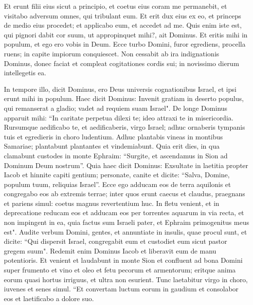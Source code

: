 \begin{biblechapter}
\verse Et erunt filii eius sicut a principio, et coetus eius coram me permanebit, et visitabo adversum omnes, qui tribulant eum. 
\verse Et erit dux eius ex eo, et princeps de medio eius procedet; et applicabo eum, et accedet ad me. Quis enim iste est, qui pignori dabit cor suum, ut appropinquet mihi?, ait Dominus. 
\verse Et eritis mihi in populum, et ego ero vobis in Deum. 
\verse Ecce turbo Domini, furor egrediens, procella ruens; in capite impiorum conquiescet. 
\verse Non cessabit ab ira indignationis Dominus, donec faciat et compleat cogitationes cordis sui; in novissimo dierum intellegetis ea. 
\end{biblechapter}

\begin{biblechapter}  
\verse In tempore illo, dicit Dominus, ero Deus universis cognationibus Israel, et ipsi erunt mihi in populum. 
\verse Haec dicit Dominus: Invenit gratiam in deserto populus, qui remanserat a gladio; vadet ad requiem suam Israel". 
\verse De longe Dominus apparuit mihi: “In caritate perpetua dilexi te; ideo attraxi te in misericordia. 
\verse Rursumque aedificabo te, et aedificaberis, virgo Israel; adhuc ornaberis tympanis tuis et egredieris in choro ludentium. 
\verse Adhuc plantabis vineas in montibus Samariae; plantabunt plantantes et vindemiabunt. 
\verse Quia erit dies, in qua clamabunt custodes in monte Ephraim: “Surgite, et ascendamus in Sion ad Dominum Deum nostrum”. 
\verse Quia haec dicit Dominus: Exsultate in laetitia propter Iacob et hinnite capiti gentium; personate, canite et dicite: “Salva, Domine, populum tuum, reliquias Israel”. 
\verse Ecce ego adducam eos de terra aquilonis et congregabo eos ab extremis terrae; inter quos erunt caecus et claudus, praegnans et pariens simul: coetus magnus revertentium huc. 
\verse In fletu venient, et in deprecatione reducam eos et adducam eos per torrentes aquarum in via recta, et non impingent in ea, quia factus sum Israeli pater, et Ephraim primogenitus meus est". 
\verse Audite verbum Domini, gentes, et annuntiate in insulis, quae procul sunt, et dicite: “Qui dispersit Israel, congregabit eum et custodiet eum sicut pastor gregem suum". 
\verse Redemit enim Dominus Iacob et liberavit eum de manu potentioris. 
\verse Et venient et laudabunt in monte Sion et confluent ad bona Domini super frumento et vino et oleo et fetu pecorum et armentorum; eritque anima eorum quasi hortus irriguus, et ultra non esurient. 
\verse Tunc laetabitur virgo in choro, iuvenes et senes simul. “Et convertam luctum eorum in gaudium et consolabor eos et laetificabo a dolore suo. 

\end{biblechapter}
